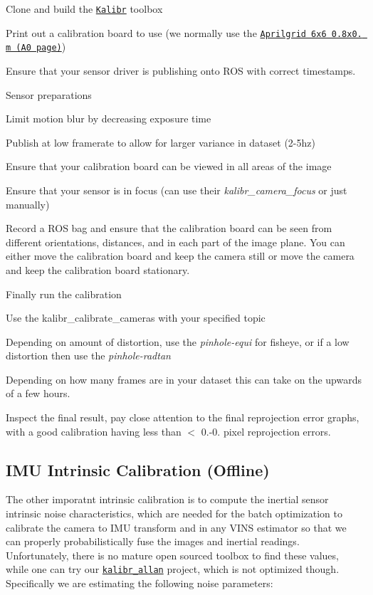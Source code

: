 \begin{DoxyEnumerate}
\item Clone and build the \href{https://github.com/ethz-asl/kalibr/}{\tt Kalibr} toolbox
\item Print out a calibration board to use (we normally use the \href{https://drive.google.com/file/d/0B0T1sizOvRsUdjFJem9mQXdiMTQ/edit?usp=sharing}{\tt Aprilgrid 6x6 0.\+8x0. m (A0 page)})
\item Ensure that your sensor driver is publishing onto R\+OS with correct timestamps.
\item Sensor preparations
\begin{DoxyItemize}
\item Limit motion blur by decreasing exposure time
\item Publish at low framerate to allow for larger variance in dataset (2-\/5hz)
\item Ensure that your calibration board can be viewed in all areas of the image
\item Ensure that your sensor is in focus (can use their {\itshape kalibr\+\_\+camera\+\_\+focus} or just manually)
\end{DoxyItemize}
\item Record a R\+OS bag and ensure that the calibration board can be seen from different orientations, distances, and in each part of the image plane. You can either move the calibration board and keep the camera still or move the camera and keep the calibration board stationary.
\item Finally run the calibration
\begin{DoxyItemize}
\item Use the kalibr\+\_\+calibrate\+\_\+cameras with your specified topic
\item Depending on amount of distortion, use the {\itshape pinhole-\/equi} for fisheye, or if a low distortion then use the {\itshape pinhole-\/radtan}
\item Depending on how many frames are in your dataset this can take on the upwards of a few hours.
\end{DoxyItemize}
\item Inspect the final result, pay close attention to the final reprojection error graphs, with a good calibration having less than $<$ 0.-\/0. pixel reprojection errors.
\end{DoxyEnumerate}\hypertarget{gs-calibration_gs-calib-imu-static}{}\subsection{I\+M\+U Intrinsic Calibration (\+Offline)}\label{gs-calibration_gs-calib-imu-static}
The other imporatnt intrinsic calibration is to compute the inertial sensor intrinsic noise characteristics, which are needed for the batch optimization to calibrate the camera to I\+MU transform and in any V\+I\+NS estimator so that we can properly probabilistically fuse the images and inertial readings. Unfortunately, there is no mature open sourced toolbox to find these values, while one can try our \href{https://github.com/rpng/kalibr_allan}{\tt kalibr\+\_\+allan} project, which is not optimized though. Specifically we are estimating the following noise parameters\+:

